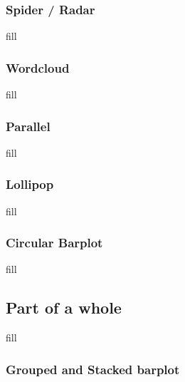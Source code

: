 \documentclass[
  b5paper]{book}
\begin{document}
\hypertarget{spider-radar}{%
\subsubsection*{Spider / Radar}\label{spider-radar}}

fill

\hypertarget{wordcloud}{%
\subsubsection*{Wordcloud}\label{wordcloud}}

fill

\hypertarget{parallel}{%
\subsubsection*{Parallel}\label{parallel}}

fill

\hypertarget{lollipop}{%
\subsubsection*{Lollipop}\label{lollipop}}

fill

\hypertarget{circular-barplot}{%
\subsubsection*{Circular Barplot}\label{circular-barplot}}

fill

\hypertarget{part-of-a-whole}{%
\subsection*{Part of a whole}\label{part-of-a-whole}}

fill

\hypertarget{grouped-and-stacked-barplot}{%
\subsubsection*{Grouped and Stacked barplot}\label{grouped-and-stacked-barplot}}
\end{document}
